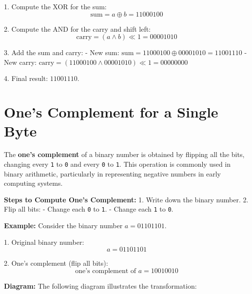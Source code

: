 \documentclass{report}
\begin{document}
1. Compute the XOR for the sum:
   \[
   \text{sum} = a \oplus b = 11000100
   \]

2. Compute the AND for the carry and shift left:
   \[
   \text{carry} = (a \land b) \ll 1 = 00001010
   \]

3. Add the sum and carry:
   - New sum: \( \text{sum} = 11000100 \oplus 00001010 = 11001110 \)
   - New carry: \( \text{carry} = (11000100 \land 00001010) \ll 1 = 00000000 \)

4. Final result: \( 11001110 \).

\section{One's Complement for a Single Byte}

The \textbf{one's complement} of a binary number is obtained by flipping all the bits, changing every \texttt{1} to \texttt{0} and every \texttt{0} to \texttt{1}. This operation is commonly used in binary arithmetic, particularly in representing negative numbers in early computing systems.

\textbf{Steps to Compute One's Complement:}
1. Write down the binary number.
2. Flip all bits:
   - Change each \texttt{0} to \texttt{1}.
   - Change each \texttt{1} to \texttt{0}.

\textbf{Example:}
Consider the binary number \(a = 01101101\).

1. Original binary number:
   \[
   a = 01101101
   \]

2. One's complement (flip all bits):
   \[
   \text{one's complement of } a = 10010010
   \]

\textbf{Diagram:}
The following diagram illustrates the transformation:

\begin{center}
\end{center}
\end{document}
